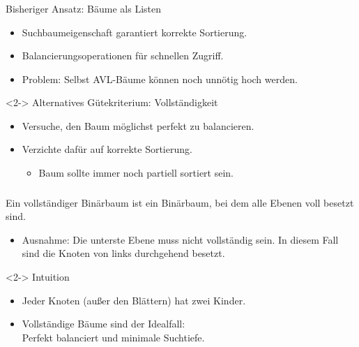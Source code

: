 \begin{frame}
\frametitle{\insertsection}
\begin{block}
{Bisheriger Ansatz: Bäume als Listen}
\begin{itemize}
	\item[\positive] Suchbaumeigenschaft garantiert korrekte Sortierung.
	\item[\positive] Balancierungsoperationen für schnellen Zugriff.
	\item[\negative] Problem: Selbst AVL-Bäume können noch unnötig hoch werden.
\end{itemize}
\end{block}
\begin{block}<2->
{Alternatives Gütekriterium: Vollständigkeit}
\begin{itemize}
	\item Versuche, den Baum möglichst perfekt zu balancieren.
	\item Verzichte dafür auf korrekte Sortierung.
	\begin{itemize}
		\item Baum sollte immer noch partiell sortiert sein.
	\end{itemize}
\end{itemize}
\end{block}
\end{frame}

\begin{frame}
\frametitle{\insertsection}
\begin{definition}
	Ein vollständiger Binärbaum ist ein Binärbaum, bei dem alle Ebenen voll
	besetzt sind.
	\begin{itemize}
		\item Ausnahme: Die unterste Ebene muss nicht vollständig sein.
			In diesem Fall sind die Knoten von links durchgehend besetzt.
	\end{itemize}
\end{definition}
\begin{block}<2->
{Intuition}
\begin{itemize}
	\item Jeder Knoten (außer den Blättern) hat zwei Kinder.
	\item Vollständige Bäume sind der Idealfall:\\
		Perfekt balanciert und minimale Suchtiefe.
\end{itemize}
\end{block}
\end{frame}


